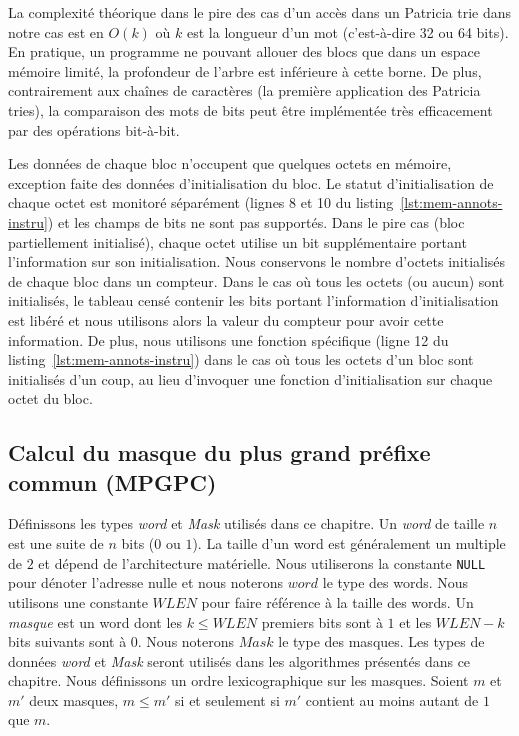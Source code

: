 La complexité théorique dans le pire des cas d'un accès dans un Patricia trie
dans notre cas est en $O(k)$ où $k$ est la longueur d'un mot (c'est-à-dire
32 ou 64 bits).
En pratique, un programme ne pouvant allouer des blocs que dans un
espace mémoire limité, la profondeur de l'arbre est inférieure à cette borne.
De plus, contrairement aux chaînes de caractères (la première application des
Patricia tries), la comparaison des mots de bits peut être implémentée très
efficacement par des opérations bit-à-bit.

Les données de chaque bloc n'occupent que quelques octets en mémoire, exception
faite des données d'initialisation du bloc.
Le statut d'initialisation de chaque octet est monitoré séparément
(lignes 8 et 10 du listing~\ref{lst:mem-annots-instru}) et les champs
de bits ne sont pas supportés.
Dans le pire cas (bloc partiellement initialisé), chaque octet utilise un bit
supplémentaire portant l'information sur son initialisation.
Nous conservons le nombre d'octets initialisés de chaque bloc dans un
compteur.
Dans le cas où tous les octets (ou aucun) sont initialisés, le tableau censé
contenir les bits portant l'information d'initialisation est libéré et nous
utilisons alors la valeur du compteur pour avoir cette information.
De plus, nous utilisons une fonction spécifique (ligne 12 du
listing~\ref{lst:mem-annots-instru}) dans le cas où tous les octets
d'un bloc sont initialisés d'un coup, au lieu d'invoquer une fonction
d'initialisation sur chaque octet du bloc.


\subsection{Calcul du masque du plus grand préfixe commun (MPGPC)}
\label{sec:mpgpc}

%

Définissons les types {\em word} et {\em Mask} utilisés dans ce chapitre.
Un {\em word} de taille $n$ est une suite de $n$ bits ($0$ ou $1$).
La taille d'un word est généralement un multiple de $2$ et dépend de
l'architecture matérielle.
Nous utiliserons la constante \lstinline'NULL' pour dénoter l'adresse
nulle et nous noterons $word$ le type des words.
Nous utilisons une constante $WLEN$ pour faire référence à la taille des words.
Un {\em masque} est un word dont les $k \le WLEN$ premiers bits sont à $1$ et
les $WLEN-k$ bits suivants sont à $0$.
Nous noterons $Mask$ le type des masques.
Les types de données {\em word} et {\em Mask} seront utilisés dans les
algorithmes présentés dans ce chapitre.
Nous définissons un ordre lexicographique sur les masques.
Soient $m$ et $m'$ deux masques, $m \le m'$ si et seulement si $m'$ contient au
moins autant de $1$ que $m$.

